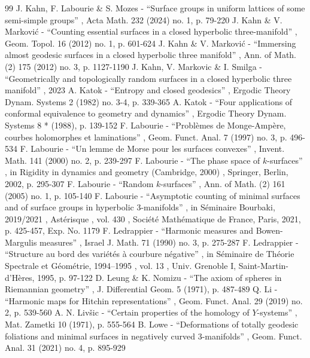 \documentclass[11pt]{article}
\theoremstyle{plain}
\theoremstyle{definition}
\begin{document}
\begin{thebibliography}{99}
 J. Kahn, F. Labourie \& S. Mozes - “Surface groups in uniform lattices of some semi-simple groups” , Acta Math. 232 (2024) no. 1, p. 79-220
 J. Kahn \& V. Marković - “Counting essential surfaces in a closed hyperbolic three-manifold” , Geom. Topol. 16 (2012) no. 1, p. 601-624
 J. Kahn \& V. Marković - “Immersing almost geodesic surfaces in a closed hyperbolic three manifold” , Ann. of Math. (2) 175 (2012) no. 3, p. 1127-1190
 J. Kahn, V. Markovic \& I. Smilga - “Geometrically and topologically random surfaces in a closed hyperbolic three manifold” , 2023
 A. Katok - “Entropy and closed geodesics” , Ergodic Theory Dynam. Systems 2 (1982) no. 3-4, p. 339-365
 A. Katok - “Four applications of conformal equivalence to geometry and dynamics” , Ergodic Theory Dynam. Systems 8 * (1988), p. 139-152
 F. Labourie - “Problèmes de Monge-Ampère, courbes holomorphes et laminations” , Geom. Funct. Anal. 7 (1997) no. 3, p. 496-534
 F. Labourie - “Un lemme de Morse pour les surfaces convexes” , Invent. Math. 141 (2000) no. 2, p. 239-297
 F. Labourie - “The phase space of $k$-surfaces” , in Rigidity in dynamics and geometry (Cambridge, 2000) , Springer, Berlin, 2002, p. 295-307
 F. Labourie - “Random $k$-surfaces” , Ann. of Math. (2) 161 (2005) no. 1, p. 105-140
 F. Labourie - “Asymptotic counting of minimal surfaces and of surface groups in hyperbolic 3-manifolds” , in Séminaire Bourbaki, 2019/2021 , Astérisque , vol. 430 , Société Mathématique de France, Paris, 2021, p. 425-457, Exp. No. 1179
 F. Ledrappier - “Harmonic measures and Bowen-Margulis measures” , Israel J. Math. 71 (1990) no. 3, p. 275-287
 F. Ledrappier - “Structure au bord des variétés à courbure négative” , in Séminaire de Théorie Spectrale et Géométrie, 1994–1995 , vol. 13 , Univ. Grenoble I, Saint-Martin-d’Hères, 1995, p. 97-122
 D. Leung \& K. Nomizu - “The axiom of spheres in Riemannian geometry” , J. Differential Geom. 5 (1971), p. 487-489
 Q. Li - “Harmonic maps for Hitchin representations” , Geom. Funct. Anal. 29 (2019) no. 2, p. 539-560
 A. N. Livšic - “Certain properties of the homology of $Y$-systems” , Mat. Zametki 10 (1971), p. 555-564
 B. Lowe - “Deformations of totally geodesic foliations and minimal surfaces in negatively curved 3-manifolds” , Geom. Funct. Anal. 31 (2021) no. 4, p. 895-929

\end{thebibliography}
\end{document}
